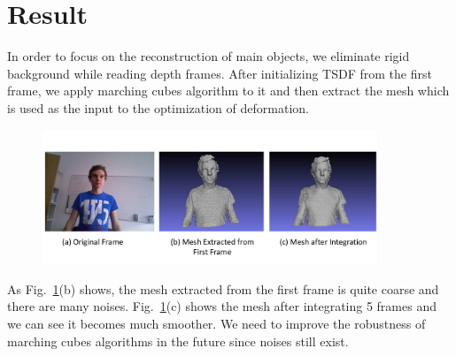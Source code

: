\documentclass{article}
\begin{document}
\section{Result}
In order to focus on the reconstruction of main objects, we eliminate rigid background while reading depth frames. After initializing TSDF from the first frame, we apply marching cubes algorithm to it and then extract the mesh which is used as the input to the optimization of deformation. 
\begin{figure}[h]
\centering
\includegraphics[width=10cm]{figures/upperbody.png}
\caption{ }
\label{fig:uppperbody}
\end{figure}
As Fig.~\ref{fig:uppperbody}(b) shows, the mesh extracted from the first frame is quite coarse and there are many noises. Fig.~\ref{fig:uppperbody}(c) shows the mesh after integrating 5 frames and we can see it becomes much smoother. We need to improve the robustness of marching cubes algorithms in the future since noises still exist. 



\end{document}
